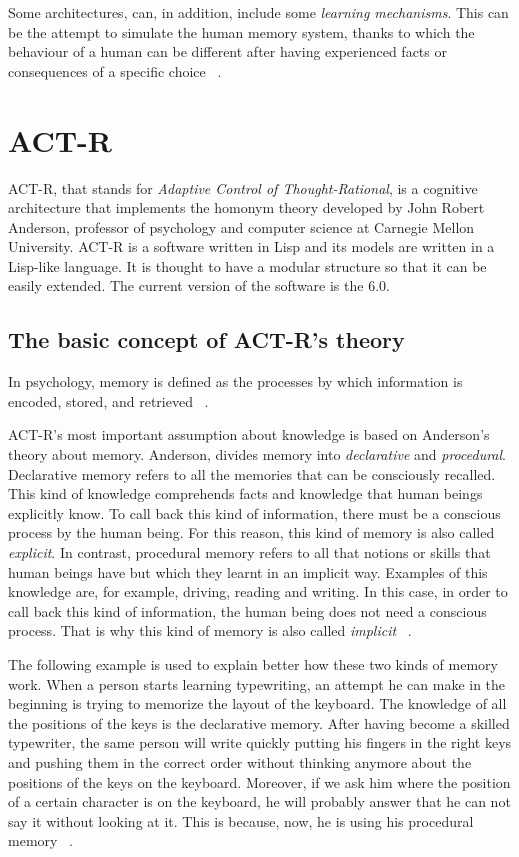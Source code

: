 	Some architectures, can, in addition, include some \emph{learning mechanisms}. This can be the attempt to simulate the human memory system, thanks to which the behaviour of a human can be different after having experienced facts or consequences of a specific choice ~\cite{Sears2012}.
	
	
  \section{ACT-R}
	\mbox{ACT-R}, that stands for \emph{Adaptive Control of Thought-Rational}, is a cognitive architecture that implements the homonym theory developed by John Robert Anderson, professor of psychology and computer science at Carnegie Mellon University. 
	\mbox{ACT-R} is a software written in Lisp and its models are written in a Lisp-like language. It is thought to have a modular structure so that it can be easily extended. The current version of the software is the 6.0. 
		
	\subsection*{The basic concept of ACT-R's theory}
	In psychology, memory is defined as the processes by which information is encoded, stored, and retrieved ~\cite{baddeley2009memory}. 
	
	\mbox{ACT-R's} most important assumption about knowledge is based on Anderson's theory about memory. 
	Anderson, divides memory into \emph{declarative} and \emph{procedural}. 
	Declarative memory refers to all the memories that can be consciously recalled. This kind of knowledge comprehends facts and knowledge that human beings explicitly know. To call back this kind of information, there must be a conscious process by the human being. For this reason, this kind of memory is also called \emph{explicit}.
	In contrast, procedural memory refers to all that notions or skills that human beings have but which they learnt in an implicit way. Examples of this knowledge are, for example, driving, reading and writing. In this case, in order to call back this kind of information, the human being does not need a conscious process. That is why this kind of memory is also called \emph{implicit} ~\cite{anderson1976language}. 
	
	The following example is used to explain better how these two kinds of memory work. 
	When a person starts learning typewriting, an attempt he can make in the beginning is trying to memorize the layout of the keyboard. The knowledge of all the positions of the keys is the declarative memory. After having become a skilled typewriter, the same person will write quickly putting his fingers in the right keys and pushing them in the correct order without thinking anymore about the positions of the keys on the keyboard. Moreover, if we ask him where the position of a certain character is on the keyboard, he will probably answer that he can not say it without looking at it. This is because, now, he is using his procedural memory ~\cite{anderson1993rules}.
	
